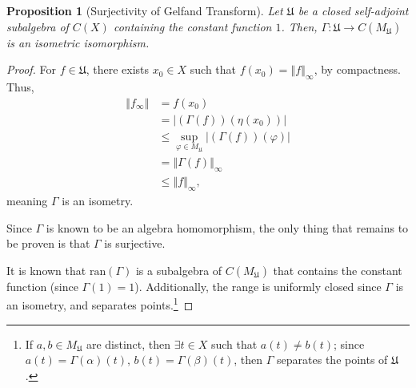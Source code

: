 \documentclass[10pt]{extarticle}
\newcommand{\norm}[1]{\left\Vert #1\right\Vert}
\theoremstyle{plain}
\newtheorem*{proposition}{Proposition}
\theoremstyle{definition}
\theoremstyle{note}
\renewcommand{\newline}{\hfill\break}
\begin{document}
\begin{proposition}[Surjectivity of Gelfand Transform]
  Let $\mathfrak{U}$ be a closed self-adjoint subalgebra of $C(X)$ containing the constant function $1$. Then, $\Gamma: \mathfrak{U} \rightarrow C\left(M_{\mathfrak{U}}\right)$ is an isometric isomorphism.
\end{proposition}
\begin{proof}
  For $f\in \mathfrak{U}$, there exists $x_0 \in X$ such that $f\left(x_0\right) = \norm{f}_{\infty}$, by compactness. Thus,
  \begin{align*}
    \norm{f_{\infty}} &= f\left(x_0\right)\\
                      &= \left\vert \left(\Gamma(f)\right)\left(\eta\left(x_0\right)\right) \right\vert\\
                      &\leq \sup_{\varphi \in M_{\mathfrak{U}}}\left\vert \left(\Gamma(f)\right)(\varphi) \right\vert\\
                      &= \norm{\Gamma(f)}_{\infty}\\
                      &\leq \norm{f}_{\infty},
  \end{align*}
  meaning $\Gamma$ is an isometry.\newline

  Since $\Gamma$ is known to be an algebra homomorphism, the only thing that remains to be proven is that $\Gamma$ is surjective.\newline

  It is known that $\text{ran}\left(\Gamma\right)$ is a subalgebra of $C\left(M_{\mathfrak{U}}\right)$ that contains the constant function (since $\Gamma(1) = 1$). Additionally, the range is uniformly closed since $\Gamma$ is an isometry, and separates points.\footnote{If $a,b\in M_{\mathfrak{U}}$ are distinct, then $\exists t\in X$ such that $a(t)\neq b(t)$; since $a(t) = \Gamma(\alpha)(t)$, $b(t) = \Gamma(\beta)(t)$, then $\Gamma$ separates the points of $\mathfrak{U}$.}\newline


\end{proof}
\end{document}
